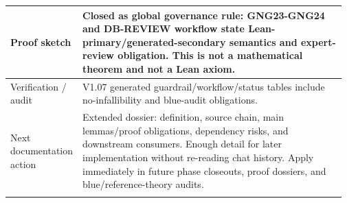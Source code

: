 \begin{longtable}{L{0.16\linewidth} L{0.81\linewidth}}
\hline\addlinespace[0.20em]
Proof sketch & Closed as global governance rule: GNG23-GNG24 and DB-REVIEW workflow state Lean-primary/\allowbreak{}generated-secondary semantics and expert-review obligation. This is not a mathematical theorem and not a Lean axiom.\\
\hline\addlinespace[0.20em]
Verification /\allowbreak{} audit & V1.07 generated guardrail/\allowbreak{}workflow/\allowbreak{}status tables include no-infallibility and blue-audit obligations.\\
\hline\addlinespace[0.20em]
Next documentation action & Extended dossier: definition, source chain, main lemmas/\allowbreak{}proof obligations, dependency risks, and downstream consumers. Enough detail for later implementation without re-reading chat history. Apply immediately in future phase closeouts, proof dossiers, and blue/\allowbreak{}reference-theory audits.\\
\hline\addlinespace[0.20em]
\end{longtable}
